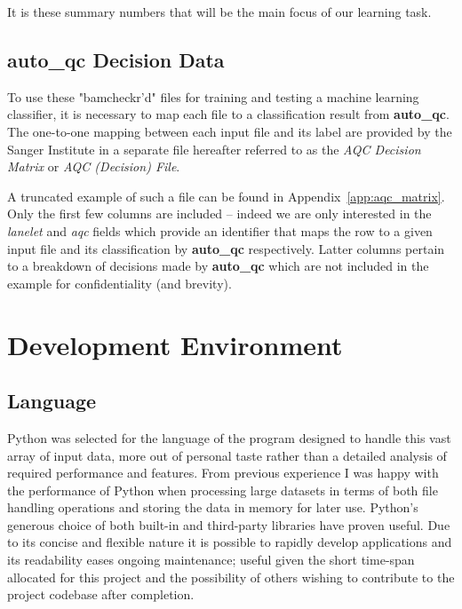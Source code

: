 It is these summary numbers that will be the main focus of our learning task.


\subsection{auto\_qc Decision Data}

To use these "bamcheckr'd" files for training and testing a machine learning
classifier, it is necessary to map each file to a classification result from
\textbf{auto\_qc}. The one-to-one mapping between each input file and its label
are provided by the Sanger Institute in a separate file hereafter referred to as
the \textit{AQC Decision Matrix} or \textit{AQC (Decision) File}.

A truncated example of such a file can be found in
Appendix~\ref{app:aqc_matrix}.  Only the first few columns are included --
indeed we are only interested in the \textit{lanelet} and \textit{aqc} fields
which provide an identifier that maps the row to a given input file and its
classification by \textbf{auto\_qc} respectively.  Latter columns pertain to a
breakdown of decisions made by \textbf{auto\_qc} which are not included in the
example for confidentiality (and brevity).


\section{Development Environment}
\label{part1:dev}

\subsection{Language}
\label{part1:dev:lang}

Python was selected for the language of the program designed to handle this vast
array of input data, more out of personal taste rather than a detailed analysis
of required performance and features. From previous experience I was happy with
the performance of Python when processing large datasets in terms of both
file handling operations and storing the data in memory for later use. Python's
generous choice of both built-in and third-party libraries have proven useful.
Due to its concise and flexible nature it is possible to rapidly
develop applications and its readability eases ongoing maintenance; useful given
the short time-span allocated for this project and the possibility of others
wishing to contribute to the project codebase after completion.

